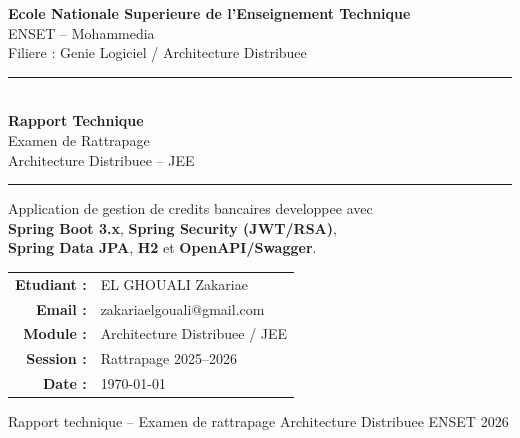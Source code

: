 \documentclass[12pt,a4paper]{report}
\begin{document}
\begin{titlepage}
\begin{center}
    \vspace*{1cm}

    {\large\textbf{Ecole Nationale Superieure de l'Enseignement Technique}}\\[0.3cm]
    {\large ENSET -- Mohammedia}\\[0.3cm]
    {\large Filiere : Genie Logiciel / Architecture Distribuee}

    \vspace{1.5cm}
    \rule{\linewidth}{1.5pt}\\[0.4cm]
    {\Huge\bfseries\color{ensetBlue} Rapport Technique}\\[0.3cm]
    {\LARGE Examen de Rattrapage}\\[0.2cm]
    {\Large Architecture Distribuee -- JEE}\\[0.3cm]
    \rule{\linewidth}{1.5pt}

    \vspace{1.5cm}

    \begin{tcolorbox}[colback=ensetBlue!8, colframe=ensetBlue,
                      title=Contexte du projet, fonttitle=\bfseries]
        Application de gestion de credits bancaires developpee avec\\
        \textbf{Spring Boot 3.x}, \textbf{Spring Security (JWT/RSA)},\\
        \textbf{Spring Data JPA}, \textbf{H2} et \textbf{OpenAPI/Swagger}.
    \end{tcolorbox}

    \vspace{2cm}

    \begin{tabular}{rl}
        \textbf{Etudiant :}   & EL GHOUALI Zakariae \\[4pt]
        \textbf{Email :}      & zakariaelgouali@gmail.com \\[4pt]
        \textbf{Module :}     & Architecture Distribuee / JEE \\[4pt]
        \textbf{Session :}    & Rattrapage 2025--2026 \\[4pt]
        \textbf{Date :}       & \today \\
    \end{tabular}

    \vfill
    {\small Rapport technique -- Examen de rattrapage Architecture Distribuee ENSET 2026}
\end{center}
\end{titlepage}
\end{document}

